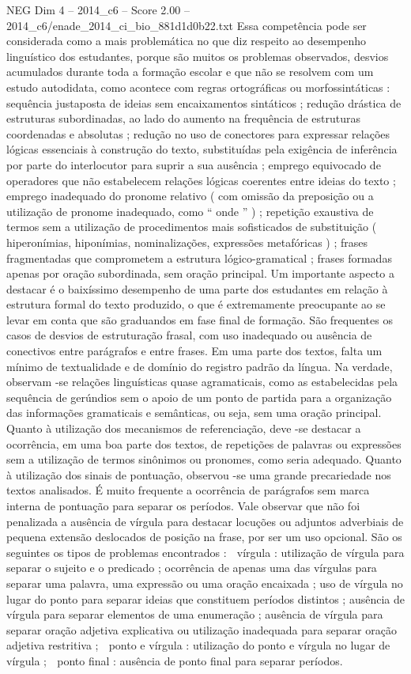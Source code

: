 \begin{textsample}{NEG Dim 4 – 2014\_c6 – Score 2.00 – 2014\_c6/enade\_2014\_ci\_bio\_881d1d0b22.txt}
Essa competência pode ser considerada como a mais problemática no que diz respeito ao desempenho linguístico dos estudantes, porque são muitos os problemas observados, desvios acumulados durante toda a formação escolar e que não se resolvem com um estudo autodidata, como acontece com regras ortográficas ou morfossintáticas : sequência justaposta de ideias sem encaixamentos sintáticos ; redução drástica de estruturas subordinadas, ao lado do aumento na frequência de estruturas coordenadas e absolutas ; redução no uso de conectores para expressar relações lógicas essenciais à construção do texto, substituídas pela exigência de inferência por parte do interlocutor para suprir a sua ausência ; emprego equivocado de operadores que não estabelecem relações lógicas coerentes entre ideias do texto ; emprego inadequado do pronome relativo ( com omissão da preposição ou a utilização de pronome inadequado, como “ onde ” ) ; repetição exaustiva de termos sem a utilização de procedimentos mais sofisticados de substituição ( hiperonímias, hiponímias, nominalizações, expressões metafóricas ) ; frases fragmentadas que comprometem a estrutura lógico-gramatical ; frases formadas apenas por oração subordinada, sem oração principal.
Um importante aspecto a destacar é o baixíssimo desempenho de uma parte dos estudantes em relação à estrutura formal do texto produzido, o que é extremamente preocupante ao se levar em conta que são graduandos em fase final de formação.
São frequentes os casos de desvios de estruturação frasal, com uso inadequado ou ausência de conectivos entre parágrafos e entre frases.
Em uma parte dos textos, falta um mínimo de textualidade e de domínio do registro padrão da língua.
Na verdade, observam -se relações linguísticas quase agramaticais, como as estabelecidas pela sequência de gerúndios sem o apoio de um ponto de partida para a organização das informações gramaticais e semânticas, ou seja, sem uma oração principal.
Quanto à utilização dos mecanismos de referenciação, deve -se destacar a ocorrência, em uma boa parte dos textos, de repetições de palavras ou expressões sem a utilização de termos sinônimos ou pronomes, como seria adequado.
Quanto à utilização dos sinais de pontuação, observou -se uma grande precariedade nos textos analisados.
É muito frequente a ocorrência de parágrafos sem marca interna de pontuação para separar os períodos.
Vale observar que não foi penalizada a ausência de vírgula para destacar locuções ou adjuntos adverbiais de pequena extensão deslocados de posição na frase, por ser um uso opcional.
São os seguintes os tipos de problemas encontrados :  vírgula : utilização de vírgula para separar o sujeito e o predicado ; ocorrência de apenas uma das vírgulas para separar uma palavra, uma expressão ou uma oração encaixada ; uso de vírgula no lugar do ponto para separar ideias que constituem períodos distintos ; ausência de vírgula para separar elementos de uma enumeração ; ausência de vírgula para separar oração adjetiva explicativa ou utilização inadequada para separar oração adjetiva restritiva ;  ponto e vírgula : utilização do ponto e vírgula no lugar de vírgula ;  ponto final : ausência de ponto final para separar períodos.

\end{textsample}

